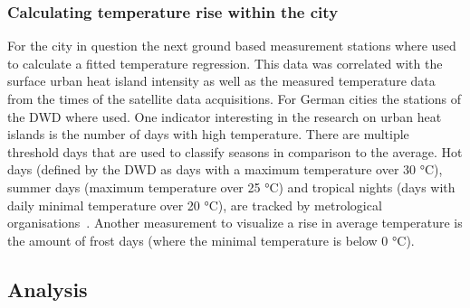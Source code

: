 \documentclass[12pt,a4paper, english]{article}
\begin{document}
    \newpage
    \subsubsection{Calculating temperature rise within the city}
    For the city in question the next ground based measurement stations where used to calculate a fitted temperature regression. 
    This data %
    was correlated with the surface urban heat island intensity as well as the measured temperature data from the times of the satellite data acquisitions. 
    For German cities the stations of the \gls{DWD} where used.
    One indicator interesting in the research on urban heat islands is the number of days with high temperature.
    There are multiple threshold days that are used to classify seasons in comparison to the average.
    Hot days (defined by the \gls{DWD} as days with a maximum temperature over 30 °C), summer days (maximum temperature over 25 °C) and tropical nights (days with daily minimal temperature over 20 °C), are tracked by metrological organisations~\cite{dwdklimalexikon}.
    Another measurement to visualize a rise in average temperature is the amount of frost days (where the minimal temperature is below 0 °C). 
  \subsection{Analysis}
\end{document}
